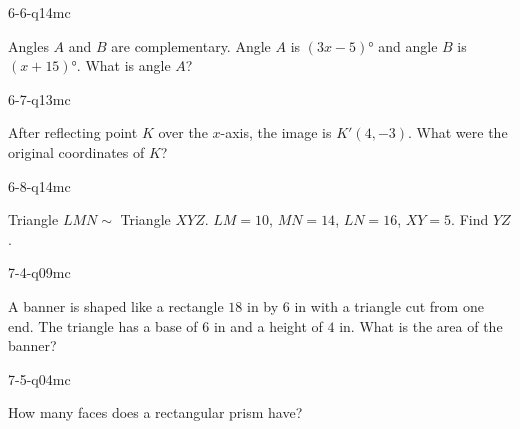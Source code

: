 \begin{practiceQuestion}{6-6-q14}{mc}
\begin{questionText}
Angles $A$ and $B$ are complementary. Angle $A$ is $(3x - 5)°$ and angle $B$ is $(x + 15)°$. What is angle $A$?
\end{questionText}
\end{practiceQuestion}

\begin{practiceQuestion}{6-7-q13}{mc}
\begin{questionText}
After reflecting point $K$ over the $x$-axis, the image is $K'(4, -3)$. What were the original coordinates of $K$?
\end{questionText}
\end{practiceQuestion}

\begin{practiceQuestion}{6-8-q14}{mc}
\begin{questionText}
Triangle $LMN \sim$ Triangle $XYZ$. $LM = 10$, $MN = 14$, $LN = 16$, $XY = 5$. Find $YZ$.
\end{questionText}
\end{practiceQuestion}

\begin{practiceQuestion}{7-4-q09}{mc}
\begin{questionText}
A banner is shaped like a rectangle $18$ in by $6$ in with a triangle cut from one end. The triangle has a base of $6$ in and a height of $4$ in. What is the area of the banner?
\end{questionText}
\end{practiceQuestion}

\begin{practiceQuestion}{7-5-q04}{mc}
\begin{questionText}
How many faces does a rectangular prism have?
\end{questionText}
\end{practiceQuestion}

